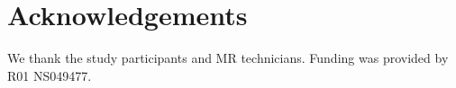 \section{Acknowledgements}

We thank the study participants and MR technicians. Funding was provided by R01 NS049477.